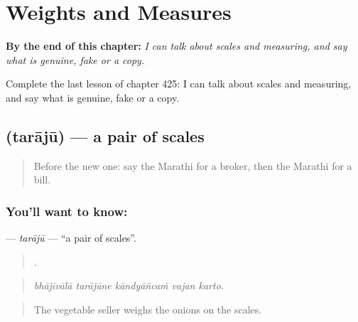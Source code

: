 
\chapter{Weights and Measures}
\label{ch:mr-weights-and-measures}

\begin{chapteropening}
\textbf{By the end of this chapter:} \emph{I can talk about scales and measuring, and say what is genuine, fake or a copy.}

Complete the last lesson of chapter 425: I can talk about scales and measuring, and say what is genuine, fake or a copy.
\end{chapteropening}

\section[\texorpdfstring{\mr{तराजू} (tarājū)}{तराजू (tarājū)}]{ (tarājū) — a pair of scales}

\label{lesson:MR-C425-taraju}



\begin{quote}
Before the new one: say the Marathi for a broker, then the Marathi for a bill.
\end{quote}

\subsection*{You'll want to know: }
\textbf{} — \emph{tarājū} — \textquotedblleft{}a pair of scales\textquotedblright{}.

\begin{quote}
    .
\end{quote}

\begin{quote}
\emph{bhājīvālā tarājūne kāndyāñcaṁ vajan karto.}
\end{quote}

\begin{quote}
The vegetable seller weighs the onions on the scales.
\end{quote}

